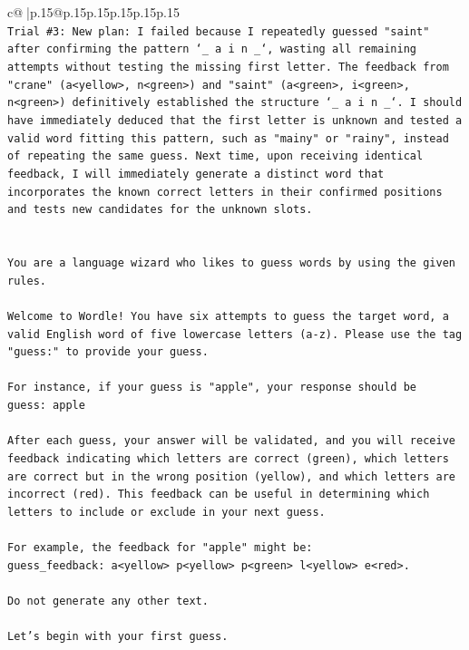 \documentclass{article}
\begin{document}
{\begin{supertabular}{c@{$\;$}|p{.15\linewidth}@{}p{.15\linewidth}p{.15\linewidth}p{.15\linewidth}p{.15\linewidth}p{.15\linewidth}}
{{{\\ 
\texttt{Trial \#3: New plan: I failed because I repeatedly guessed "saint" after confirming the pattern `\_ a i n \_`, wasting all remaining attempts without testing the missing first letter. The feedback from "crane" (a<yellow>, n<green>) and "saint" (a<green>, i<green>, n<green>) definitively established the structure `\_ a i n \_`. I should have immediately deduced that the first letter is unknown and tested a valid word fitting this pattern, such as "mainy" or "rainy", instead of repeating the same guess. Next time, upon receiving identical feedback, I will immediately generate a distinct word that incorporates the known correct letters in their confirmed positions and tests new candidates for the unknown slots.} \\
\\ 
\\ 
\texttt{You are a language wizard who likes to guess words by using the given rules.} \\
\\ 
\texttt{Welcome to Wordle! You have six attempts to guess the target word, a valid English word of five lowercase letters (a{-}z). Please use the tag "guess:" to provide your guess.} \\
\\ 
\texttt{For instance, if your guess is "apple", your response should be} \\
\texttt{guess: apple} \\
\\ 
\texttt{After each guess, your answer will be validated, and you will receive feedback indicating which letters are correct (green), which letters are correct but in the wrong position (yellow), and which letters are incorrect (red). This feedback can be useful in determining which letters to include or exclude in your next guess.} \\
\\ 
\texttt{For example, the feedback for "apple" might be:} \\
\texttt{guess\_feedback: a<yellow> p<yellow> p<green> l<yellow> e<red>.} \\
\\ 
\texttt{Do not generate any other text.} \\
\\ 
\texttt{Let's begin with your first guess.} \\
            }
        }
    }
     \\ \\


\end{supertabular}}
\end{document}
